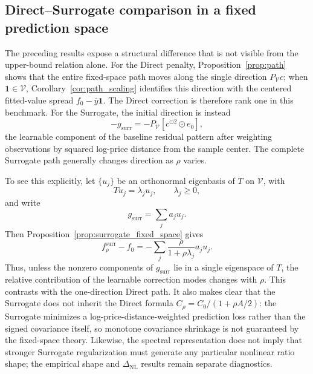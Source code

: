 \documentclass[10pt]{article}
\theoremstyle{definition}
\newcommand{\1}{\mathbf{1}}
\newcommand{\Vcal}{\mathcal{V}}
\newcommand{\newtext}[1]{\textcolor{impGreen}{#1}}
\begin{document}
\subsection{\newtext{Direct--Surrogate comparison in a fixed prediction space}}

{\color{impGreen}
The preceding results expose a structural difference that is not visible from the upper-bound relation alone. For the Direct penalty, Proposition~\ref{prop:path} shows that the entire fixed-space path moves along the single direction $P_{\Vcal}c$; when $\1\in\Vcal$, Corollary~\ref{cor:path_scaling} identifies this direction with the centered fitted-value spread $f_0-\bar y\1$. The Direct correction is therefore rank one in this benchmark. For the Surrogate, the initial direction is instead
\[
-g_{\mathrm{surr}}
=
-P_{\Vcal}
\left[c^{\odot2}\odot e_0\right],
\]
the learnable component of the baseline residual pattern after weighting observations by squared log-price distance from the sample center. The complete Surrogate path generally changes direction as $\rho$ varies.}

{\color{impGreen}
To see this explicitly, let $\{u_j\}$ be an orthonormal eigenbasis of $T$ on $\Vcal$, with
\[
Tu_j=\lambda_j u_j,
\qquad
\lambda_j\geq0,
\]
and write
\[
g_{\mathrm{surr}}=\sum_j a_j u_j.
\]
Then Proposition~\ref{prop:surrogate_fixed_space} gives
\begin{equation}
\label{eq:surrogate_spectral_path}
f_\rho^{\mathrm{surr}}-f_0
=
-\sum_j
\frac{\rho}{1+\rho\lambda_j}
a_j u_j.
\end{equation}
Thus, unless the nonzero components of $g_{\mathrm{surr}}$ lie in a single eigenspace of $T$, the relative contribution of the learnable correction modes changes with $\rho$. This contrasts with the one-direction Direct path. It also makes clear that the Surrogate does not inherit the Direct formula
$C_\rho=C_0/(1+\rho A/2)$: the Surrogate minimizes a log-price-distance-weighted prediction loss rather than the signed covariance itself, so monotone covariance shrinkage is not guaranteed by the fixed-space theory. Likewise, the spectral representation does not imply that stronger Surrogate regularization must generate any particular nonlinear ratio shape; the empirical shape and $\Delta_{\mathrm{NL}}$ results remain separate diagnostics.}

\end{document}
